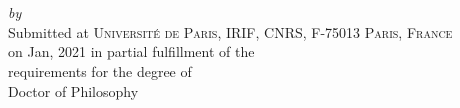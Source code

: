 
\begin{titlepage}
  \vspace*{5cm}
  \makeatletter
  \begin{center}
    \begin{Huge}
      \@title
    \end{Huge}\\[0.1cm]
    \begin{Large}
      \@subtitle
    \end{Large}\\
    \emph{by}\\
    \@author
    \vfill
    Submitted at \textsc{Université de Paris, IRIF, CNRS, F-75013 Paris, France}\\
    on Jan, 2021 in partial fulfillment of the\\
    requirements for the degree of\\
    Doctor of Philosophy
  \end{center}
  \makeatother
\end{titlepage}

\newpage
\null
\thispagestyle{empty}
\newpage

